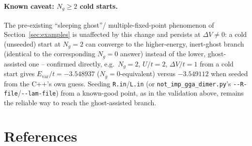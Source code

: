 \documentclass[11pt]{article}
\newcommand{\Ng}{N_{g}}
\begin{document}
\paragraph{Known caveat: $\Ng\ge2$ cold starts.} The pre-existing ``sleeping ghost''/
multiple-fixed-point phenomenon of Section~\ref{sec:examples} is unaffected by this
change and persists at $\Delta V\neq0$: a cold (unseeded) start at $\Ng=2$ can converge
to the higher-energy, inert-ghost branch (identical to the corresponding $\Ng=0$ answer)
instead of the lower, ghost-assisted one -- confirmed directly, e.g.\ $\Ng=2$, $U/t=2$,
$\Delta V/t=1$ from a cold start gives $E_{\mathrm{var}}/t=-3.548937$ ($\Ng=0$-equivalent)
versus $-3.549112$ when seeded from the C++'s own guess. Seeding \texttt{R.in}/\texttt{L.in}
(or \texttt{not\_imp\_gga\_dimer.py}'s \texttt{-{}-R-file}/\texttt{-{}-lam-file}) from a
known-good point, as in the validation above, remains the reliable way to reach the
ghost-assisted branch.

\section{References}
\label{sec:refs}
\end{document}
